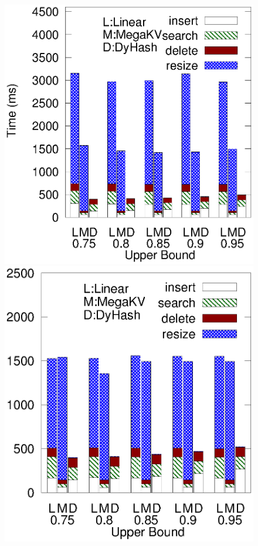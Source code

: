 \begin{figure}[h]
	\begin{minipage}{0.18\linewidth}\centering
		\includegraphics[width=\linewidth]{pic/dynamic/twitter/diff_upper.eps}
		\centerline{\dstwitter}
	\end{minipage}
	\hfill
	\begin{minipage}{0.18\linewidth}\centering
		\includegraphics[width=\linewidth]{pic/dynamic/reddit/diff_upper.eps}

\end{minipage}
\end{figure}

